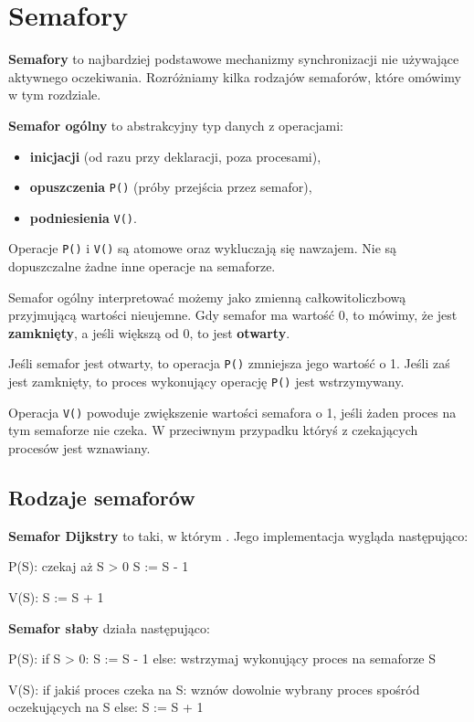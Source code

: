 \section{Semafory}

\textbf{Semafory} to najbardziej podstawowe mechanizmy synchronizacji nie używające aktywnego oczekiwania. Rozróżniamy kilka rodzajów semaforów, które omówimy w tym rozdziale.

\textbf{Semafor ogólny} to abstrakcyjny typ danych z operacjami: 
\begin{itemize}
    \item \textbf{inicjacji} (od razu przy deklaracji, poza procesami),
    \item \textbf{opuszczenia} \texttt{P()} (próby przejścia przez semafor),
    \item \textbf{podniesienia} \texttt{V()}.
\end{itemize}

Operacje \texttt{P()} i \texttt{V()} są atomowe oraz wykluczają się nawzajem. Nie są dopuszczalne żadne inne operacje na semaforze.

Semafor ogólny interpretować możemy jako zmienną całkowitoliczbową przyjmującą wartości nieujemne. Gdy semafor ma wartość 0, to mówimy, że jest \textbf{zamknięty}, a jeśli większą od 0, to jest \textbf{otwarty}.

Jeśli semafor jest otwarty, to operacja \texttt{P()} zmniejsza jego wartość o 1. Jeśli zaś jest zamknięty, to proces wykonujący operację \texttt{P()} jest wstrzymywany.

Operacja \texttt{V()} powoduje zwiększenie wartości semafora o 1, jeśli żaden proces na tym semaforze nie czeka. W przeciwnym przypadku któryś z czekających procesów jest wznawiany. 

\subsection{Rodzaje semaforów}

\textbf{Semafor Dijkstry} to taki, w którym . Jego implementacja wygląda następująco:
\begin{java}
P(S):
    czekaj aż S > 0
    S := S - 1

V(S):
    S := S + 1
\end{java}

\textbf{Semafor słaby} działa następująco:
\begin{java}
P(S):
    if S > 0:
        S := S - 1
    else:
        wstrzymaj wykonujący proces na semaforze S

V(S):
    if jakiś proces czeka na S:
        wznów dowolnie wybrany proces spośród oczekujących na S
    else:
        S := S + 1
\end{java}

